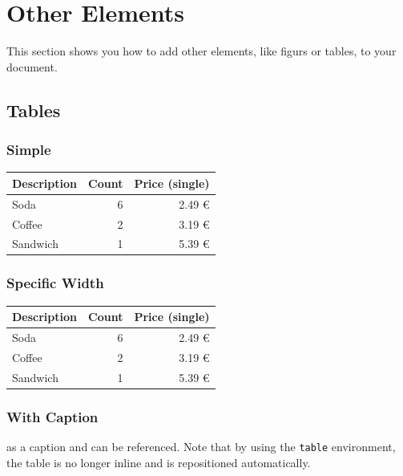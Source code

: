\chapter{Other Elements}

This section shows you how to add other elements, like figurs or tables, to your document.

\section{Tables}

\subsection{Simple}

\begin{center}
\begin{tabular}{lrr}
	\toprule
	Description & Count & Price (single)\\
	\midrule
	Soda & 6 & 2.49 €\\
	Coffee & 2 & 3.19 €\\
	Sandwich & 1 & 5.39 €\\
	\bottomrule
\end{tabular}
\end{center}

\subsection{Specific Width}

\begin{center}
\begin{tabularx}{0.75\textwidth}{Xrr}
	\toprule
	Description & Count & Price (single)\\
	\midrule
	Soda & 6 & 2.49 €\\
	Coffee & 2 & 3.19 €\\
	Sandwich & 1 & 5.39 €\\
	\bottomrule
\end{tabularx}
\end{center}

\subsection{With Caption}

 as a caption and can be referenced.
Note that by using the \texttt{table} environment, the table is no longer inline and is repositioned automatically.


